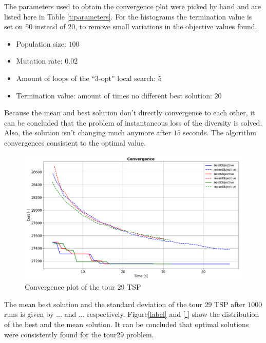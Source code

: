 \documentclass[a4paper,10pt]{article}
\begin{document}
The parameters used to obtain the convergence plot were picked by hand and are listed here in Table \ref{t:parameters}. For the histograms the termination value is set on $ 50 $ instead of $ 20 $, to remove small variations in the objective values found.
\begin{itemize}
	\item Population size: $ 100 $
	\item Mutation rate: $ 0.02 $
	\item Amount of loops of the ``3-opt'' local search: $ 5 $
	\item Termination value: amount of times no different best solution: $ 20 $ 
\end{itemize}
  
Because the mean and best solution don't directly convergence to each other, it can be concluded that the problem of instantaneous loss of the diversity is solved. Also, the solution isn't changing much anymore after $ 15 $ seconds. The algorithm convergences consistent to the optimal value. 


\begin{figure}[h]
	\includegraphics[width=1\textwidth]{Convergence_tour29.PNG}
	\caption{Convergence plot of the tour 29 TSP}
	\label{fig:convergence_tour29}
	\centering
\end{figure}

The mean best solution and the standard deviation of the tour 29 TSP after $ 1000 $ runs is given by ...  and ... respectively. Figure\ref{label} and \ref{ } show the distribution of the best and the mean solution. It can be concluded that optimal solutions were consistently found for the tour29 problem.  

\end{document}
